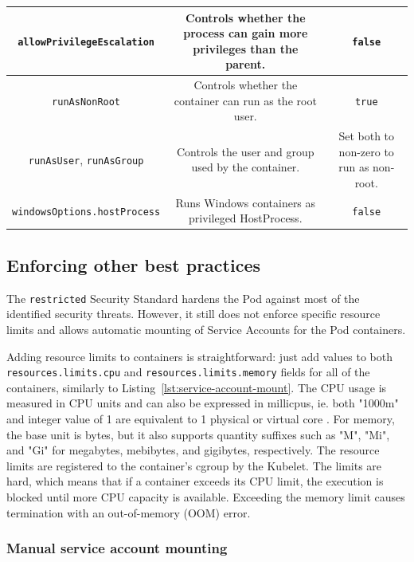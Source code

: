 \documentclass[english, 12pt, a4paper, sci, utf8, a-2b, online]{aaltothesis}
\begin{document}
\begin{table}[H]
\begin{minipage}{\textwidth}
\begin{tabularx}{\textwidth}{CCC}
    \lstinline{allowPrivilegeEscalation} & Controls whether the process can gain more privileges than the parent. & \lstinline{false} \\ \hline
    \lstinline{runAsNonRoot} & Controls whether the container can run as the root user. & \lstinline{true} \\ \hline
    \lstinline{runAsUser}, \lstinline{runAsGroup} & Controls the user and group used by the container. & Set both to non-zero to run as non-root. \\ \hline
    \lstinline{windowsOptions.hostProcess} & Runs Windows containers as privileged HostProcess. & \lstinline{false} \\ \hline
  \end{tabularx}
  \end{minipage}
\end{table}

\subsection{Enforcing other best practices}

The \lstinline{restricted} Security Standard hardens the Pod against most of the identified security threats.
However, it still does not enforce specific resource limits and allows automatic mounting of Service Accounts for the Pod containers.

Adding resource limits to containers is straightforward: just add values to both \lstinline{resources.limits.cpu} and \lstinline{resources.limits.memory} fields for all of the containers, similarly to Listing~\ref{lst:service-account-mount}.
The CPU usage is measured in CPU units and can also be expressed in millicpus, ie. both "1000m" and integer value of 1 are equivalent to 1 physical or virtual core \cite{k8s-docs-resources}.
For memory, the base unit is bytes, but it also supports quantity suffixes such as "M", "Mi", and "Gi" for megabytes, mebibytes, and gigibytes, respectively.
The resource limits are registered to the container's cgroup by the Kubelet.
The limits are hard, which means that if a container exceeds its CPU limit, the execution is blocked until more CPU capacity is available.
Exceeding the memory limit causes termination with an out-of-memory (OOM) error.

\subsubsection{Manual service account mounting}
\end{document}
